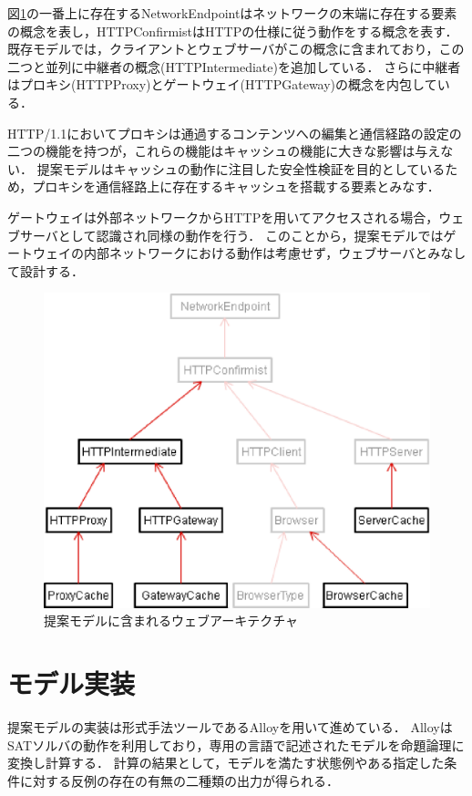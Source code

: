 \documentclass{css}
\begin{document}
図\ref{fig:model_header}の一番上に存在するNetworkEndpointはネットワークの末端に存在する要素の概念を表し，HTTPConfirmistはHTTPの仕様に従う動作をする概念を表す．
既存モデルでは，クライアントとウェブサーバがこの概念に含まれており，この二つと並列に中継者の概念(HTTPIntermediate)を追加している．
さらに中継者はプロキシ(HTTPProxy)とゲートウェイ(HTTPGateway)の概念を内包している．

HTTP/1.1においてプロキシは通過するコンテンツへの編集と通信経路の設定の二つの機能を持つが，これらの機能はキャッシュの機能に大きな影響は与えない．
提案モデルはキャッシュの動作に注目した安全性検証を目的としているため，プロキシを通信経路上に存在するキャッシュを搭載する要素とみなす．

ゲートウェイは外部ネットワークからHTTPを用いてアクセスされる場合，ウェブサーバとして認識され同様の動作を行う．
このことから，提案モデルではゲートウェイの内部ネットワークにおける動作は考慮せず，ウェブサーバとみなして設計する．

\begin{figure}[htb]
\centering
\includegraphics[width=0.8\hsize]{model_archi.eps}
\caption{提案モデルに含まれるウェブアーキテクチャ}
\label{fig:model_header}
\end{figure}

\section{モデル実装}
\label{sec:implementation}
提案モデルの実装は形式手法ツールであるAlloyを用いて進めている．
AlloyはSATソルバの動作を利用しており，専用の言語で記述されたモデルを命題論理に変換し計算する．
計算の結果として，モデルを満たす状態例やある指定した条件に対する反例の存在の有無の二種類の出力が得られる．
\end{document}
